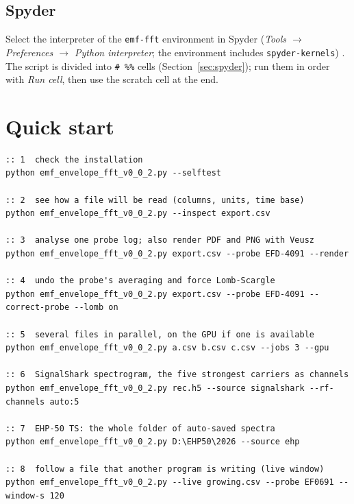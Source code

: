 \documentclass[10pt,letterpaper]{article}
\numberwithin{equation}{section}
\begin{document}
\subsection{Spyder}
Select the interpreter of the \texttt{emf-fft} environment in Spyder
(\emph{Tools $\rightarrow$ Preferences $\rightarrow$ Python interpreter}; the
environment includes \texttt{spyder-kernels}) \cite{B35}. The script is
divided into \verb|# %%| cells (Section~\ref{sec:spyder}); run them in order
with \emph{Run cell}, then use the scratch cell at the end.

\section{Quick start}\label{sec:quickstart}

\begin{Verbatim}
:: 1  check the installation
python emf_envelope_fft_v0_0_2.py --selftest

:: 2  see how a file will be read (columns, units, time base)
python emf_envelope_fft_v0_0_2.py --inspect export.csv

:: 3  analyse one probe log; also render PDF and PNG with Veusz
python emf_envelope_fft_v0_0_2.py export.csv --probe EFD-4091 --render

:: 4  undo the probe's averaging and force Lomb-Scargle
python emf_envelope_fft_v0_0_2.py export.csv --probe EFD-4091 --correct-probe --lomb on

:: 5  several files in parallel, on the GPU if one is available
python emf_envelope_fft_v0_0_2.py a.csv b.csv c.csv --jobs 3 --gpu

:: 6  SignalShark spectrogram, the five strongest carriers as channels
python emf_envelope_fft_v0_0_2.py rec.h5 --source signalshark --rf-channels auto:5

:: 7  EHP-50 TS: the whole folder of auto-saved spectra
python emf_envelope_fft_v0_0_2.py D:\EHP50\2026 --source ehp

:: 8  follow a file that another program is writing (live window)
python emf_envelope_fft_v0_0_2.py --live growing.csv --probe EF0691 --window-s 120
\end{Verbatim}
\end{document}
